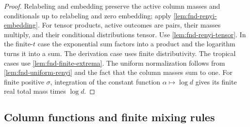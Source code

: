 \documentclass[9pt]{extarticle}
\theoremstyle{definition}
\theoremstyle{remark}
\begin{document}
\begin{proof}
Relabeling and embedding preserve the active column masses and conditionals
up to relabeling and zero embedding; apply
\cref{lem:fnd-renyi-embedding}.  For tensor products, active outcomes are
pairs, their masses multiply, and their conditional distributions tensor.
Use \cref{lem:fnd-renyi-tensor}.  In the finite-$t$ case the exponential sum
factors into a product and the logarithm turns it into a sum.  The derivation
case uses finite distributivity.  The tropical cases use
\cref{lem:fnd-finite-extrema}.  The uniform normalization follows from
\cref{lem:fnd-uniform-renyi} and the fact that the column masses sum to one.
For finite positive $\sigma$, integration of the constant function
$\alpha\mapsto\log d$ gives its finite real total mass times $\log d$.
\end{proof}

\subsection{Column functions and finite mixing rules}
\end{document}
